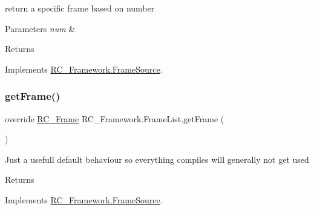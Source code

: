 return a specific frame based on number 


\begin{DoxyParams}{Parameters}
{\em num} & \\
\hline
\end{DoxyParams}
\begin{DoxyReturn}{Returns}

\end{DoxyReturn}


Implements \mbox{\hyperlink{class_r_c___framework_1_1_frame_source_a562dc295b5c265ec760227978802eb3a}{R\+C\+\_\+\+Framework.\+Frame\+Source}}.

\mbox{\label{class_r_c___framework_1_1_frame_list_ab91faad4e97b6e118d1b49d267d15b34}} 
\subsubsection{\texorpdfstring{get\+Frame()}{getFrame()}\hspace{0.1cm}{\footnotesize\ttfamily [2/2]}}
{\footnotesize\ttfamily override \mbox{\hyperlink{class_r_c___framework_1_1_r_c___frame}{R\+C\+\_\+\+Frame}} R\+C\+\_\+\+Framework.\+Frame\+List.\+get\+Frame (\begin{DoxyParamCaption}{ }\end{DoxyParamCaption})\hspace{0.3cm}{\ttfamily [virtual]}}



Just a usefull default behaviour so everything compiles will generally not get used 

\begin{DoxyReturn}{Returns}

\end{DoxyReturn}


Implements \mbox{\hyperlink{class_r_c___framework_1_1_frame_source_a6fd84a8d608da7d9ff2ff5ab10ed4243}{R\+C\+\_\+\+Framework.\+Frame\+Source}}.

\mbox{\label{class_r_c___framework_1_1_frame_list_a298e87d53528b497f85fdf61bf519972}} 
